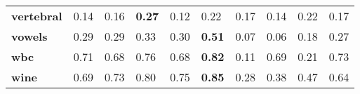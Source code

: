 \begin{adjustbox}{angle=270}
\begin{tabular}{llllllllll}
\textbf{vertebral  } &   0.14 &     0.16 &  \textbf{0.27} &     0.12 &  0.22 &    0.17 &  0.14 &    0.22 &  0.17 \\
\textbf{vowels     } &   0.29 &     0.29 &  0.33 &     0.30 &  \textbf{0.51} &    0.07 &  0.06 &    0.18 &  0.27 \\
\textbf{wbc        } &   0.71 &     0.68 &  0.76 &     0.68 &  \textbf{0.82} &    0.11 &  0.69 &    0.21 &  0.73 \\
\textbf{wine       } &   0.69 &     0.73 &  0.80 &     0.75 &  \textbf{0.85} &    0.28 &  0.38 &    0.47 &  0.64 \\
\bottomrule
\end{tabular}
\end{adjustbox}
